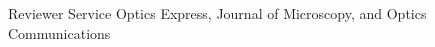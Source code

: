 \begin{rubric}{Reviewer Service}
    \entry* Optics Express, Journal of Microscopy, and Optics Communications
\end{rubric}
